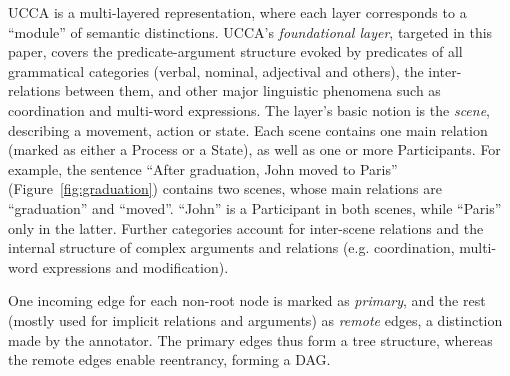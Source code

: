 \documentclass[11pt,a4paper]{article}
\newcommand{\figref}[1]{Figure~\ref{#1}}
\begin{document}
UCCA is a multi-layered representation, where each layer corresponds
to a ``module'' of semantic distinctions.
UCCA's \textit{foundational layer}, targeted in this paper, covers the predicate-argument
structure evoked by predicates of all grammatical categories
(verbal, nominal, adjectival and others), the inter-relations between them,
and other major linguistic phenomena such as coordination and multi-word expressions.
The layer's basic notion is the \textit{scene}, describing a movement, action or state.
Each scene contains one main relation (marked as either a Process or a State),
as well as one or more Participants.
For example, the sentence ``After graduation, John moved to Paris'' (\figref{fig:graduation})
contains two scenes, whose main relations are ``graduation'' and ``moved''.
``John'' is a Participant in both scenes, while ``Paris'' only in the latter.
Further categories account for inter-scene relations and the internal structure of
complex arguments and relations (e.g. coordination, multi-word expressions and modification).

One incoming edge for each non-root node is marked as \textit{primary},
and the rest (mostly used for implicit relations and arguments) as \textit{remote} edges,
a distinction made by the annotator.
The primary edges thus form a tree structure, whereas the remote edges enable reentrancy,
forming a DAG.
\end{document}
